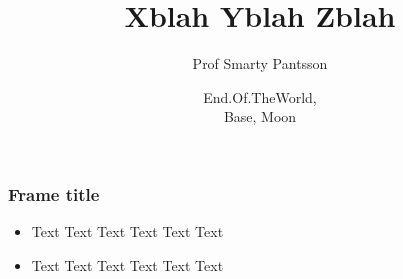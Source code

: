 \documentclass[xcolor=dvipsnames]{beamer}
\title[XYZ]{Xblah Yblah Zblah}
\author{Prof Smarty Pantsson}
\date{End.Of.TheWorld,\\Base, Moon}
\begin{document}
\frame{\titlepage}

\begin{frame}
  \frametitle{Frame title}

  \begin{itemize}
    \item Text Text Text Text Text Text
    \item Text Text Text Text Text Text
  \end{itemize}
\end{frame}
\end{document}
